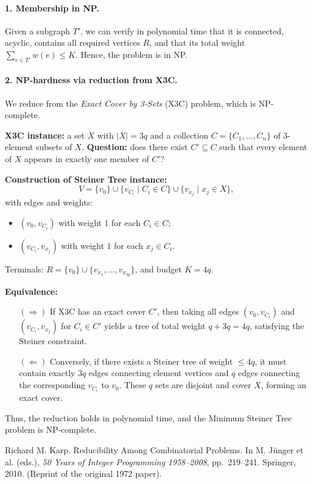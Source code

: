 \documentclass{article}
\begin{document}
\paragraph{1. Membership in NP.}
Given a subgraph $T'$, we can verify in polynomial time that it is connected, acyclic, contains all required vertices $R$, and that its total weight $\sum_{e \in T'} w(e) \le K$. Hence, the problem is in NP.

\paragraph{2. NP-hardness via reduction from X3C.}
We reduce from the \emph{Exact Cover by 3-Sets} (X3C) problem, which is NP-complete.

\textbf{X3C instance:} a set $X$ with $|X|=3q$ and a collection $C=\{C_1,\dots,C_n\}$ of 3-element subsets of $X$.  
\textbf{Question:} does there exist $C'\subseteq C$ such that every element of $X$ appears in exactly one member of $C'$?

\textbf{Construction of Steiner Tree instance:}
\[
V=\{v_0\}\cup\{v_{C_i}\mid C_i\in C\}\cup\{v_{x_j}\mid x_j\in X\},
\]
with edges and weights:
\begin{itemize}
  \item $(v_0,v_{C_i})$ with weight $1$ for each $C_i\in C$;
  \item $(v_{C_i},v_{x_j})$ with weight $1$ for each $x_j\in C_i$.
\end{itemize}
Terminals: $R=\{v_0\}\cup\{v_{x_1},\dots,v_{x_{3q}}\}$, and budget $K=4q$.

\textbf{Equivalence:}
\begin{itemize}
  \item[$(\Rightarrow)$] If X3C has an exact cover $C'$, then taking all edges 
  $(v_0,v_{C_i})$ and $(v_{C_i},v_{x_j})$ for $C_i\in C'$ yields a tree of total weight $q+3q=4q$, satisfying the Steiner constraint.
  \item[$(\Leftarrow)$] Conversely, if there exists a Steiner tree of weight $\le 4q$, it must contain exactly $3q$ edges connecting element vertices and $q$ edges connecting the corresponding $v_{C_i}$ to $v_0$. These $q$ sets are disjoint and cover $X$, forming an exact cover.
\end{itemize}

Thus, the reduction holds in polynomial time, and the Minimum Steiner Tree problem is NP-complete.


\begin{thebibliography}{9}

Richard M. Karp.
\newblock Reducibility Among Combinatorial Problems.
\newblock In M. J{\"u}nger et al. (eds.), \emph{50 Years of Integer Programming 1958--2008}, pp.~219--241. Springer, 2010.
\newblock (Reprint of the original 1972 paper).

\end{thebibliography}
\end{document}
